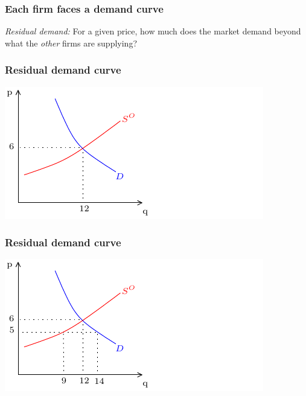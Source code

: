 \documentclass[xcolor=pdftex,dvipsnames]{beamer}
\begin{document}
\begin{frame}
\frametitle{Each firm faces a demand curve}
\emph{Residual demand:} For a given price, how much does the market
demand beyond what the \emph{other} firms are supplying?
\bigskip




\end{frame}




\begin{frame}
\frametitle{Residual demand curve}
\begin{center}
\includegraphics{pics/ResD1}
\end{center}

\end{frame}
\begin{frame}
\frametitle{Residual demand curve}
\begin{center}
\includegraphics{pics/ResD2}
\end{center}

\end{frame}
\end{document}
